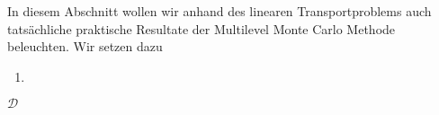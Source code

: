 
In diesem Abschnitt wollen wir anhand des linearen Transportproblems auch tatsächliche praktische Resultate der Multilevel Monte Carlo Methode beleuchten.
Wir setzen dazu
\begin{enumerate}
	\item 
\end{enumerate} $ \mathcal{D} $